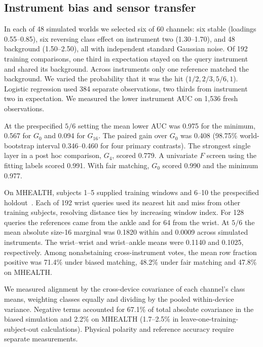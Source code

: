 \subsection{Instrument bias and sensor transfer}
In each of 48 simulated worlds we selected six of 60 channels: six stable (loadings 0.55--0.85), six reversing class effect on instrument two (1.30--1.70), and 48 background (1.50--2.50), all with independent standard Gaussian noise. Of 192 training comparisons, one third in expectation stayed on the query instrument and shared its background. Across instruments only one reference matched the background. We varied the probability that it was the hit ($1/2,2/3,5/6,1$). Logistic regression used 384 separate observations, two thirds from instrument two in expectation. We measured the lower instrument AUC on 1,536 fresh observations.

At the prespecified $5/6$ setting the mean lower AUC was 0.975 for the minimum, 0.567 for $G_0$ and 0.094 for $G_{16}$. The paired gain over $G_0$ was 0.408 (98.75\% world-bootstrap interval 0.346--0.460 for four primary contrasts). The strongest single layer in a post hoc comparison, $G_4$, scored 0.779. A univariate $F$ screen using the fitting labels scored 0.991. With fair matching, $G_0$ scored 0.990 and the minimum 0.977.

On MHEALTH, subjects 1--5 supplied training windows and 6--10 the prespecified holdout~\citep{banos2014mhealth}. Each of 192 wrist queries used its nearest hit and miss from other training subjects, resolving distance ties by increasing window index. For 128 queries the references came from the ankle and for 64 from the wrist. At $5/6$ the mean absolute size-16 marginal was 0.1820 within and 0.0009 across simulated instruments. The wrist--wrist and wrist--ankle means were 0.1140 and 0.1025, respectively. Among nonabstaining cross-instrument votes, the mean row fraction positive was 71.4\% under biased matching, 48.2\% under fair matching and 47.8\% on MHEALTH.

We measured alignment by the cross-device covariance of each channel's class means, weighting classes equally and dividing by the pooled within-device variance. Negative terms accounted for 67.1\% of total absolute covariance in the biased simulation and 2.2\% on MHEALTH (1.7--2.5\% in leave-one-training-subject-out calculations). Physical polarity and reference accuracy require separate measurements.

